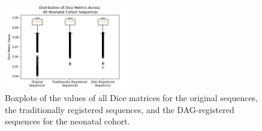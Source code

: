 \begin{figure}
\centering
\includegraphics[width=0.5\textwidth]{6/figures/neonates-dice-box.png}
\caption{Boxplots of the values of all Dice matrices for the original sequences, the traditionally registered sequences, and the DAG-registered sequences for the neonatal cohort.}
\label{fig:neonates-dice-box}
\end{figure}

